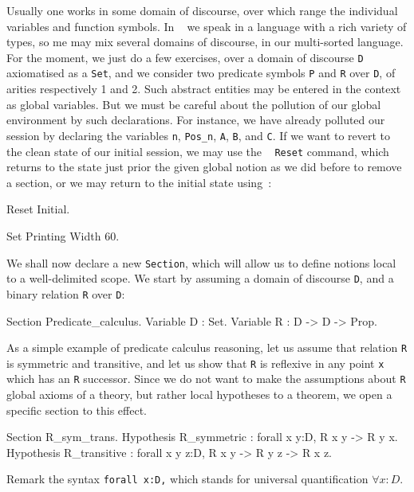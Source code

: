 \documentclass[11pt,a4paper]{book}
\begin{document}
Usually one works in some domain of discourse, over which range the individual 
variables and function symbols. In \Coq~ we speak in a language with a rich 
variety of types, so me may mix several domains of discourse, in our 
multi-sorted language. For the moment, we just do a few exercises, over a 
domain of discourse \verb:D: axiomatised as a \verb:Set:, and we consider two 
predicate symbols  \verb:P: and \verb:R: over \verb:D:, of arities 
respectively 1 and 2. Such abstract entities may be entered in the context
as global variables. But we must be careful about the pollution of our
global environment by such declarations. For instance, we have already 
polluted our \Coq~ session by declaring the variables
\verb:n:, \verb:Pos_n:, \verb:A:, \verb:B:, and \verb:C:. If we want to revert to the clean state of
our initial session, we may use the \Coq~ \verb:Reset: command, which returns
to the state just prior the given global notion as we did before to
remove a section, or we may return to the initial state using~:
\begin{coq_example}
Reset Initial.
\end{coq_example}
\begin{coq_eval}
Set Printing Width 60.
\end{coq_eval}

We shall now declare a new \verb:Section:, which will allow us to define
notions local to a well-delimited scope. We start by assuming a domain of
discourse \verb:D:, and a binary relation \verb:R:  over \verb:D:: 
\begin{coq_example}
Section Predicate_calculus.
Variable D : Set.
Variable R : D -> D -> Prop.
\end{coq_example}

As a simple example of predicate calculus reasoning, let us assume
that relation \verb:R: is symmetric and transitive, and let us show that
\verb:R: is reflexive in any point \verb:x: which has an \verb:R: successor.
Since we do not want to make the assumptions about \verb:R: global axioms of 
a theory, but rather local hypotheses to a theorem, we open a specific
section to this effect.
\begin{coq_example}
Section R_sym_trans.
Hypothesis R_symmetric : forall x y:D, R x y -> R y x.
Hypothesis R_transitive : forall x y z:D, R x y -> R y z -> R x z.
\end{coq_example}

Remark the syntax \verb+forall x:D,+ which stands for universal quantification
$\forall x : D$.
\end{document}
